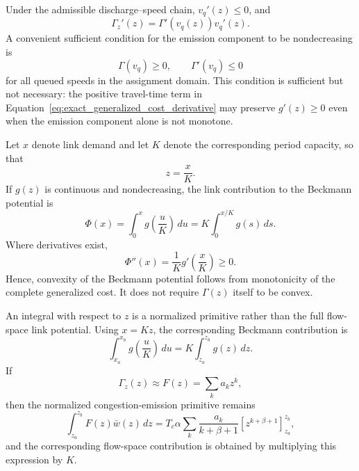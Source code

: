 Under the admissible discharge--speed chain,
$v_q'(z)\leq0$, and
\begin{equation}
\Gamma_z'(z)
=
\Gamma'(v_q(z))v_q'(z).
\end{equation}
A convenient sufficient condition for the emission component to be
nondecreasing is
\begin{equation}
\label{eq:gamma_sufficient_condition_v4}
\Gamma(v_q)\geq0,
\qquad
\Gamma'(v_q)\leq0
\end{equation}
for all queued speeds in the assignment domain. This condition is sufficient
but not necessary: the positive travel-time term in
Equation~\eqref{eq:exact_generalized_cost_derivative} may preserve
$g'(z)\geq0$ even when the emission component alone is not monotone.

Let $x$ denote link demand and let $K$ denote the corresponding period
capacity, so that
\begin{equation}
z=\frac{x}{K}.
\end{equation}
If $g(z)$ is continuous and nondecreasing, the link contribution to the
Beckmann potential is
\begin{equation}
\label{eq:flow_space_beckmann}
\Phi(x)
=
\int_0^x
g\!\left(\frac{u}{K}\right)\,du
=
K\int_0^{x/K}g(s)\,ds.
\end{equation}
Where derivatives exist,
\begin{equation}
\label{eq:beckmann_convexity_proof}
\Phi''(x)
=
\frac{1}{K}
g'\!\left(\frac{x}{K}\right)
\geq0.
\end{equation}
Hence, convexity of the Beckmann potential follows from monotonicity of the
complete generalized cost. It does not require $\Gamma(z)$ itself to be
convex.



An integral with respect to $z$ is a normalized primitive rather than the
full flow-space link potential. Using $x=Kz$, the corresponding Beckmann
contribution is
\begin{equation}
\label{eq:normalized_to_flow_primitive}
\int_{x_a}^{x_b}g\!\left(\frac{u}{K}\right)\,du
=
K\int_{z_a}^{z_b}g(z)\,dz.
\end{equation}
If
\begin{equation}
\Gamma_z(z)
\approx
F(z)
=
\sum_k a_k z^k,
\end{equation}
then the normalized congestion-emission primitive remains
\begin{equation}
\int_{z_a}^{z_b}
F(z)\bar w(z)\,dz
=
T_c\alpha
\sum_k
\frac{a_k}{k+\beta+1}
\left[
z^{k+\beta+1}
\right]_{z_a}^{z_b},
\end{equation}
and the corresponding flow-space contribution is obtained by multiplying
this expression by $K$.


